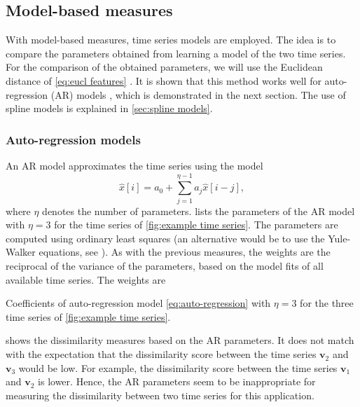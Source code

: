 \documentclass[10pt,final,a4paper,oneside,onecolumn]{article}
\newcommand{\profile}[1]{\textbf{v}_{#1}}
\theoremstyle{plain}\newtheorem{definition}{Definition}[section]    %
\theoremstyle{definition}\newtheorem{example}{Example}[section]     %
\theoremstyle{remark}\newtheorem{remarkenv}{Remark}[section]        %
\begin{document}
\subsection{Model-based measures}
\label{sec:model based}

With model-based measures, time series models are employed. The idea is to compare the parameters obtained from learning a model of the two time series. For the comparison of the obtained parameters, we will use the Euclidean distance of \cref{eq:eucl features} \cite{serra2014empirical}. It is shown that this method works well for auto-regression (AR) models \cite{piccolo1990distance, corduas2008autoregressive}, which is demonstrated in the next section. The use of spline models is explained in \cref{sec:spline models}.


\subsubsection{Auto-regression models}
\label{sec:auto regression models}
An AR model approximates the time series using the model 
\begin{equation}
	\label{eq:auto-regression}
	\hat{x}[i] = a_0 + \sum_{j=1}^{\eta-1} a_j \hat{x}[i-j],
\end{equation}
where $\eta$ denotes the number of parameters.  lists the parameters of the AR model with $\eta=3$ for the time series of \cref{fig:example time series}. The parameters are computed using ordinary least squares (an alternative would be to use the Yule-Walker equations, see \cite{gardner1988spectral}). As with the previous measures, the weights are the reciprocal of the variance of the parameters, based on the model fits of all available time series. The weights are 

\begin{table}
	\centering
	\caption{Coefficients of auto-regression model \cref{eq:auto-regression} with $\eta=3$ for the three time series of \cref{fig:example time series}.}
	\label{tab:ar coefficients}
	
\end{table}

 shows the dissimilarity measures based on the AR parameters. It does not match with the expectation that the dissimilarity score between the time series $\profile{2}$ and $\profile{3}$ would be low. For example, the dissimilarity score between the time series $\profile{1}$ and $\profile{2}$ is lower. Hence, the AR parameters seem to be inappropriate for measuring the dissimilarity between two time series for this application.
\end{document}
